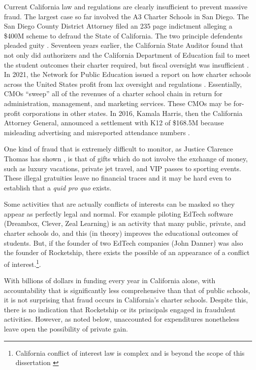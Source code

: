 Current California law and regulations are clearly insufficient to prevent massive fraud. The largest case so far involved the A3 Charter Schools in San Diego. The San Diego County District Attorney filed an 235 page indictment \parencite{SDDA2019} alleging a \$400M scheme to defraud the State of California. The two principle defendents pleaded guity \parencite{Taketa2021}.
Seventeen years earlier, the California State Auditor found that not only did authorizers and the California Department of Education fail to meet the student outcomes their charter required, but fiscal oversight was insufficient \parencite{CAStateAuditor2002}. In 2021, the Network for Public Education issued a report on how charter schools across the United States profit from lax oversight and regulations \parencite{Burris.Cimarusti2021}. Essentially, CMOs ``sweep'' all of the revenues of a charter school chain in return for administration, management, and marketing services. These CMOs may be for-profit corporations in other states. In 2016, Kamala Harris, then the California Attorney General, announced a settlement with K12 of \$168.5M because misleading advertising and misreported attendance numbers \parencite{Agpressoffice2016}.

One kind of fraud that is extremely difficult to monitor, as Justice Clarence Thomas has shown \parencite{Murphy.Mierjeski2023}, is that of gifts which do not involve the exchange of money, such as luxury vacations, private jet travel, and VIP passes to sporting events. These illegal gratuities leave no financial traces and it may be hard even to establish that a \textit{quid pro quo} exists. 

Some activities that are actually conflicts of interests can be masked so they appear as perfectly legal and normal. For example piloting EdTech software (Dreambox, Clever, Zeal Learning) is an activity that many public, private, and charter schools do, and this (in theory) improves the educational outcomes of students. But, if the founder of two EdTech companies (John Danner) was also the founder of Rocketship, there exists the possible of an appearance of a conflict of interest.\footnote{California conflict of interest law is complex and is beyond the scope of this dissertation \parencite{Chaney.etal2010}}.

With billions of dollars in funding every year in California alone, with accountability that is significantly less comprehensive than that of public schools, it is not surprising that fraud occurs in California's charter schools. Despite this, there is no indication that Rocketship or its principals engaged in fraudulent activities. However, as noted below, unaccounted for expenditures nonetheless leave open the possibility of private gain. 


